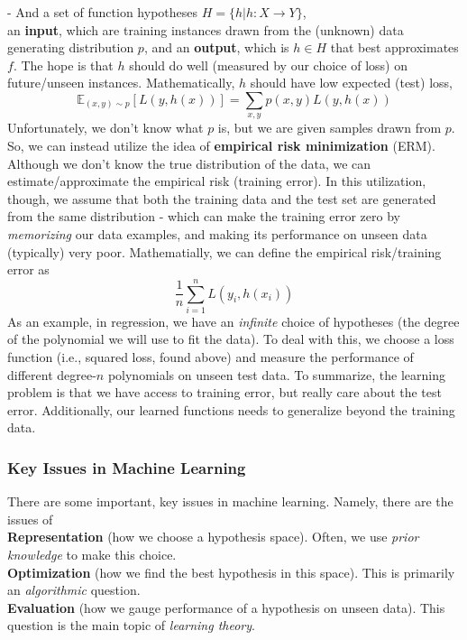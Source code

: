 \documentclass[11 pt]{scrartcl}
\begin{document}
- And a set of function hypotheses $H = \{h | h: X \rightarrow Y \}$, \\
an \textbf{input}, which are training instances drawn from the (unknown) data generating distribution $p$, and an \textbf{output}, which is $h \in H$ that best approximates $f$. The hope is that $h$ should do well (measured by our choice of loss) on future/unseen instances. Mathematically, $h$ should have low expected (test) loss, 
$$
\mathbb{E}_{(x, y) \sim p} [L(y, h(x))] = \sum_{x, y} p(x, y) L(y, h(x))
$$
Unfortunately, we don't know what $p$ is, but we are given samples drawn from $p$. So, we can instead utilize the idea of \textbf{empirical risk minimization} (ERM). Although we don't know the true distribution of the data, we can estimate/approximate the empirical risk (training error). In this utilization, though, we assume that both the training data and the test set are generated from the same distribution - which can make the training error zero by \textit{memorizing} our data examples, and making its performance on unseen data (typically) very poor. Mathematially, we can define the empirical risk/training error as
$$
\frac{1}{n} \sum_{i = 1}^n L(y_i, h(x_i))
$$
As an example, in regression, we have an \textit{infinite} choice of hypotheses (the degree of the polynomial we will use to fit the data). To deal with this, we choose a loss function (i.e., squared loss, found above) and measure the performance of different degree-$n$ polynomials on unseen test data. To summarize, the learning problem is that we have access to training error, but really care about the test error. Additionally, our learned functions needs to generalize beyond the training data.
\subsubsection{Key Issues in Machine Learning}
There are some important, key issues in machine learning. Namely, there are the issues of \\
\textbf{Representation} (how we choose a hypothesis space). Often, we use \textit{prior knowledge} to make this choice. \\
\textbf{Optimization} (how we find the best hypothesis in this space). This is primarily an \textit{algorithmic} question. \\
\textbf{Evaluation} (how we gauge performance of a hypothesis on unseen data). This question is the main topic of \textit{learning theory}. 
\end{document}
